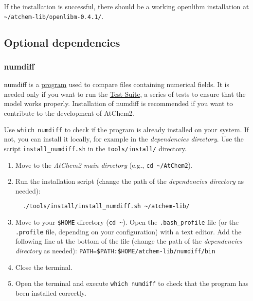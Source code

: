 If the installation is successful, there should be a working openlibm
installation at
\texttt{\textasciitilde{}/atchem-lib/openlibm-0.4.1/}.

\subsection{Optional dependencies} \label{subsec:optional-dependencies}

\subsubsection{numdiff} \label{numdiff}

numdiff is a \href{https://www.nongnu.org/numdiff/}{program} used to
compare files containing numerical fields. It is needed only if you
want to run the \hyperref[sec:testsuite]{Test Suite}, a series of
tests to ensure that the model works properly. Installation of numdiff
is recommended if you want to contribute to the development of
AtChem2.

Use \texttt{which\ numdiff} to check if the program is already
installed on your system. If not, you can install it locally, for
example in the \emph{dependencies directory}. Use the script
\texttt{install\_numdiff.sh} in the \texttt{tools/install/} directory.

\begin{enumerate}
\item Move to the \emph{AtChem2 main directory} (e.g., \texttt{cd\
    \textasciitilde{}/AtChem2}).
\item Run the installation script (change the path of the
  \emph{dependencies directory} as needed):
  \begin{verbatim}
  ./tools/install/install_numdiff.sh ~/atchem-lib/
  \end{verbatim}
\item Move to your \texttt{\$HOME} directory (\texttt{cd\
    \textasciitilde{}}). Open the \texttt{.bash\_profile} file (or the
  \texttt{.profile} file, depending on your configuration) with a text
  editor. Add the following line at the bottom of the file (change the
  path of the \emph{dependencies directory} as needed):
  \texttt{PATH=\$PATH:\$HOME/atchem-lib/numdiff/bin}
\item Close the terminal.
\item Open the terminal and execute \texttt{which\ numdiff} to check
  that the program has been installed correctly.
\end{enumerate}


